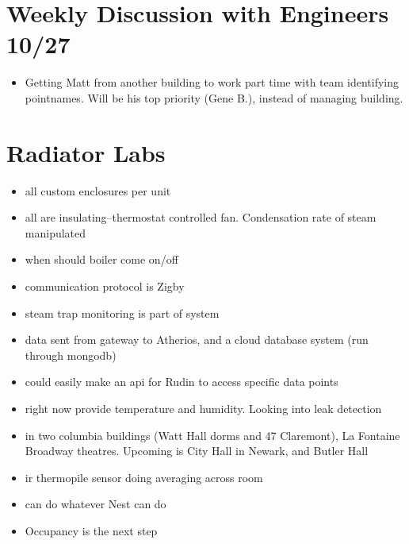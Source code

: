 \documentclass[12pt]{article}
\begin{document}
\section*{Weekly Discussion with Engineers 10/27}
\begin{itemize}
	\item Getting Matt from another building to work part time with team
		identifying pointnames. Will be his top priority (Gene B.), instead of managing
		building.
\end{itemize}
\section*{Radiator Labs}
\begin{itemize}
	\item all custom enclosures per unit
	\item all are insulating--thermostat controlled fan. Condensation rate of
		steam manipulated
	\item when should boiler come on/off
	\item communication protocol is Zigby
	\item steam trap monitoring is part of system
	\item data sent from gateway to Atherios, and a cloud database system (run
		through mongodb)
	\item could easily make an api for Rudin to access specific data points
	\item right now provide temperature and humidity. Looking into leak
		detection
	\item in two columbia buildings (Watt Hall dorms and 47 Claremont), La Fontaine Broadway theatres.
		Upcoming is City Hall in Newark, and Butler Hall
	\item ir thermopile sensor doing averaging across room
	\item can do whatever Nest can do
	\item Occupancy is the next step


\end{itemize}
\end{document}
